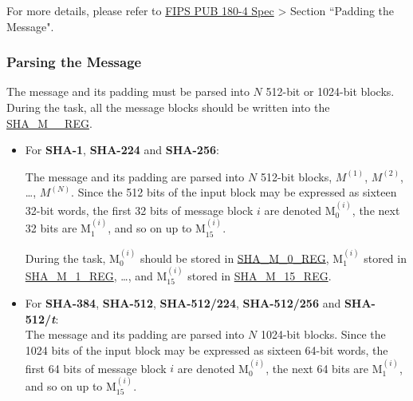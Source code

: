 \documentclass[main\_\_EN.tex]{subfiles}
\begin{document}
For more details, please refer to \href{https://doi.org/10.6028/NIST.FIPS.180-4}{FIPS PUB 180-4 Spec} > Section ``Padding the Message".

\subsubsection{Parsing the Message}\label{sec:sha-parsing-message}

The message and its padding must be parsed into \begin{math}N\end{math} 512-bit or 1024-bit blocks. During the task, all the message blocks should be written into the \hyperref[regdesc:SHAMNREG]{SHA\_M\_\_REG}.

\begin{itemize}
    \item For \textbf{SHA-1}, \textbf{SHA-224} and \textbf{SHA-256}:

    The message and its padding are parsed into \begin{math}N\end{math} 512-bit blocks, \begin{math}M^{(1)}\end{math}, \begin{math}M^{(2)}\end{math}, \dots, \begin{math}M^{(N)}\end{math}. Since the 512 bits of the input block may be expressed as sixteen 32-bit words, the first 32 bits of message block \begin{math}i\end{math} are denoted M$^{(i)}_{0}$, the next 32 bits are M$^{(i)}_{1}$, and so on up to M$^{(i)}_{15}$.

    During the task, M$^{(i)}_{0}$ should be stored in \hyperref[regdesc:SHAMNREG]{SHA\_M\_0\_REG}, M$^{(i)}_1$ stored in \hyperref[regdesc:SHAMNREG]{SHA\_M\_1\_REG}, \dots, and M$^{(i)}_{15}$ stored in \hyperref[regdesc:SHAMNREG]{SHA\_M\_15\_REG}.

    \item For \textbf{SHA-384}, \textbf{SHA-512}, \textbf{SHA-512/224}, \textbf{SHA-512/256} and \textbf{SHA-512/{\it{t}}}: \\

    The message and its padding are parsed into \begin{math}N\end{math} 1024-bit blocks. Since the 1024 bits of the input block may be expressed as sixteen 64-bit words, the first 64 bits of message block \begin{math}i\end{math} are denoted M$^{(i)}_{0}$, the next 64 bits are M$^{(i)}_{1}$, and so on up to M$^{(i)}_{15}$.


\end{itemize}
\end{document}
